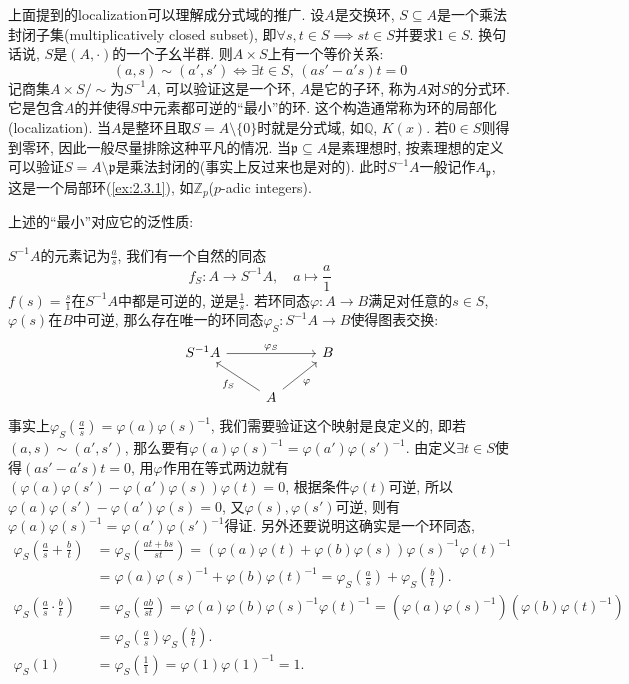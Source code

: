 \begin{remark}
    上面提到的localization可以理解成分式域的推广. 设$A$是交换环, $S \subseteq A$是一个乘法封闭子集(multiplicatively closed subset), 即$\forall s, t \in S \implies st \in S$并要求$1 \in S$. 换句话说, $S$是$(A, \cdot)$的一个子幺半群. 则$A \times S$上有一个等价关系:
    \[
        (a, s) \sim (a', s') \iff \exists t \in S,\, (as' - a's)t = 0
    \]
    记商集$A \times S / \sim$为$S^{-1}A$, 可以验证这是一个环, $A$是它的子环, 称为$A$对$S$的分式环. 它是包含$A$的并使得$S$中元素都可逆的“最小”的环. 这个构造通常称为环的局部化(localization). 当$A$是整环且取$S = A \setminus \{0\}$时就是分式域, 如$\mathbb{Q}$, $K(x)$. 若$0 \in S$则得到零环, 因此一般尽量排除这种平凡的情况. 当$\mathfrak{p} \subseteq A$是素理想时, 按素理想的定义可以验证$S = A \setminus \mathfrak{p}$是乘法封闭的(事实上反过来也是对的). 此时$S^{-1}A$一般记作$A_{\mathfrak{p}}$, 这是一个局部环(\ref{ex:2.3.1}), 如$\mathbb{Z}_p$($p$-adic integers).
    
    上述的“最小”对应它的泛性质:
    
    $S^{-1}A$的元素记为$\frac{a}{s}$, 我们有一个自然的同态
    \[
        f_S:A \to S^{-1}A,\quad a \mapsto \frac{a}{1}
    \]
    $f(s) = \frac{s}{1}$在$S^{-1}A$中都是可逆的, 逆是$\frac{1}{s}$. 若环同态$\varphi:A \to B$满足对任意的$s \in S$, $\varphi(s)$在$B$中可逆, 那么存在唯一的环同态$\varphi_S:S^{-1}A \to B$使得图表交换:
    \[
        \begin{tikzcd}
            S^{-1}A \arrow[rr, "\varphi_S"] &                                            & B \\
                                            & A \arrow[ru, "\varphi"'] \arrow[lu, "f_S"] &  
        \end{tikzcd}
    \]
    事实上$\varphi_S(\frac{a}{s}) = \varphi(a)\varphi(s)^{-1}$, 我们需要验证这个映射是良定义的, 即若$(a, s) \sim (a', s')$, 那么要有$\varphi(a)\varphi(s)^{-1} = \varphi(a')\varphi(s')^{-1}$. 由定义$\exists t \in S$使得$(as' - a's)t = 0$, 用$\varphi$作用在等式两边就有$(\varphi(a)\varphi(s') - \varphi(a')\varphi(s))\varphi(t) = 0$, 根据条件$\varphi(t)$可逆, 所以$\varphi(a)\varphi(s') - \varphi(a')\varphi(s) = 0$, 又$\varphi(s), \varphi(s')$可逆, 则有$\varphi(a)\varphi(s)^{-1} = \varphi(a')\varphi(s')^{-1}$得证. 另外还要说明这确实是一个环同态,
    \[
    \begin{aligned}
        \varphi_S(\frac{a}{s} + \frac{b}{t}) &= \varphi_S(\frac{at + bs}{st}) = (\varphi(a)\varphi(t) + \varphi(b)\varphi(s))\varphi(s)^{-1}\varphi(t)^{-1}\\
        &= \varphi(a)\varphi(s)^{-1} + \varphi(b)\varphi(t)^{-1} = \varphi_S(\frac{a}{s}) + \varphi_S(\frac{b}{t}).\\
        \varphi_S(\frac{a}{s} \cdot \frac{b}{t}) &= \varphi_S(\frac{ab}{st}) = \varphi(a)\varphi(b)\varphi(s)^{-1}\varphi(t)^{-1} = (\varphi(a)\varphi(s)^{-1})(\varphi(b)\varphi(t)^{-1})\\
        &= \varphi_S(\frac{a}{s})\varphi_S(\frac{b}{t}).\\
        \varphi_S(1) &= \varphi_S(\frac{1}{1}) = \varphi(1)\varphi(1)^{-1} = 1.
    \end{aligned}
    \]
    

\end{remark}
